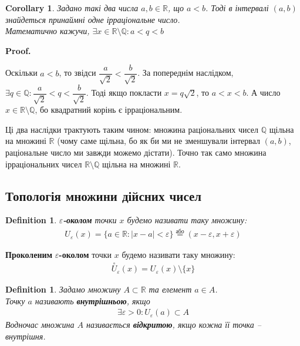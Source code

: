 \documentclass[a4paper, 14pt]{article}
\makeatletter
\def\qed{$\blacksquare$}
\theoremstyle{theoremdd}
\theoremstyle{theoremdd}
\newtheorem{definition}[theorem]{Definition}
\theoremstyle{theoremdd}
\theoremstyle{theoremdd}
\theoremstyle{theoremdd}
\theoremstyle{theoremdd}
\theoremstyle{theoremdd}
\theoremstyle{theoremdd}
\newtheorem{corollary}[theorem]{Corollary}
\renewenvironment{proof}[1][Proof.\\]{\par
\pushQED{\hfill \qed}%
\normalfont \topsep6\p@\@plus6\p@\relax
\trivlist
\item\relax
{\bfseries
#1\@addpunct{.}}\hspace\labelsep\ignorespaces
}{%
\popQED\endtrivlist\@endpefalse
}
\makeatother
\begin{document}
	\begin{corollary}
	Задано такі два числа $a,b \in \mathbb{R}$, що $a < b$. Тоді в інтервалі $(a,b)$ знайдеться принаймні одне ірраціональне число.\\
	Математично кажучи, $\exists x \in \mathbb{R} \setminus \mathbb{Q}: a < q < b$
	\end{corollary}
	
	\begin{proof}
	Оскільки $a < b$, то звідси $\dfrac{a}{\sqrt{2}} < \dfrac{b}{\sqrt{2}}$. За попереднім наслідком, $\exists q \in \mathbb{Q}: \dfrac{a}{\sqrt{2}} < q < \dfrac{b}{\sqrt{2}}$. Тоді якщо покласти $x = q \sqrt{2}$, то $a < x < b$. А число $x \in \mathbb{R} \setminus \mathbb{Q}$, бо квадратний корінь є ірраціональним.
	\end{proof}
	
	Ці два наслідки трактують таким чином: множина раціональних чисел $\mathbb{Q}$ щільна на множині $\mathbb{R}$ (чому саме щільна, бо як би ми не зменшували інтервал $(a,b)$, раціональне число ми завжди можемо дістати). Точно так само множина ірраціональних чисел $\mathbb{R} \setminus \mathbb{Q}$ щільна на множині $\mathbb{R}$.
	
	\subsection{Топологія множини дійсних чисел}
	\begin{definition}
	$\varepsilon$\textbf{-околом} точки $x$ будемо називати таку множину:
	\begin{align*}
	U_{\varepsilon}(x) = \{a \in \mathbb{R}: |x-a| < \varepsilon \} \overset{\text{або}}{=} (x-\varepsilon,x+\varepsilon)
	\end{align*}
	\end{definition}
	
	\begin{figure}[H]
	\centering
	\end{figure}
	\textbf{Проколеним} $\varepsilon$\textbf{-околом} точки $x$ будемо називати таку множину:
	\begin{align*}
	\overset{\circ}{U}_{\varepsilon}(x) = U_{\varepsilon}(x) \setminus \{x\}
	\end{align*}
\begin{definition}
Задамо множину $A \subset \mathbb{R}$ та елемент $a \in A$.\\
Точку $a$ називають \textbf{внутрішньою}, якщо
\begin{align*}
\exists \varepsilon > 0: U_{\varepsilon}(a) \subset A
\end{align*}
Водночас множина $A$ називається \textbf{відкритою}, якщо кожна її точка -- внутрішня.
\end{definition}
\end{document}
